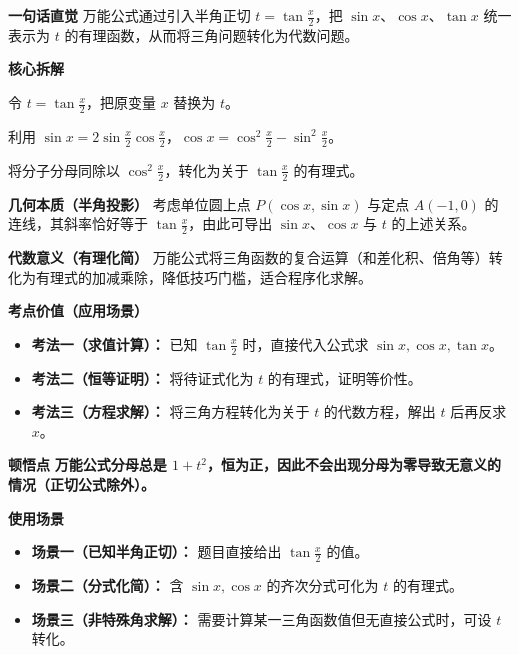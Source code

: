 \begin{explanationbox}
	\textbf{\textcolor{CExplanation}{一句话直觉}}
	万能公式通过引入半角正切 $t = \tan\frac{x}{2}$，把 $\sin x$、$\cos x$、$\tan x$ 统一表示为 $t$ 的有理函数，从而将三角问题转化为代数问题。

	\medskip
	\textbf{\textcolor{CExplanation}{核心拆解}}
	\begin{description}[style=nextline, leftmargin=2.8em, labelsep=0.5em, itemsep=0.45em]
		\item[\textbf{要点一（半角代换）：}]
			令 $t = \tan\frac{x}{2}$，把原变量 $x$ 替换为 $t$。
		\item[\textbf{要点二（二倍角转化）：}]
			利用 $\sin x = 2\sin\frac{x}{2}\cos\frac{x}{2}$，$\cos x = \cos^2\frac{x}{2} - \sin^2\frac{x}{2}$。
		\item[\textbf{要点三（有理化处理）：}]
			将分子分母同除以 $\cos^2\frac{x}{2}$，转化为关于 $\tan\frac{x}{2}$ 的有理式。
	\end{description}

	\medskip
	\textbf{\textcolor{CExplanation}{几何本质（半角投影）}}
	考虑单位圆上点 $P(\cos x, \sin x)$ 与定点 $A(-1,0)$ 的连线，其斜率恰好等于 $\tan\frac{x}{2}$，由此可导出 $\sin x$、$\cos x$ 与 $t$ 的上述关系。

	\medskip
	\textbf{\textcolor{CExplanation}{代数意义（有理化简）}}
	万能公式将三角函数的复合运算（和差化积、倍角等）转化为有理式的加减乘除，降低技巧门槛，适合程序化求解。

	\medskip
	\textbf{\textcolor{CExplanation}{考点价值（应用场景）}}
	\begin{itemize}[leftmargin=*, itemsep=0.5em, topsep=0.4em]
		\item \textbf{考法一（求值计算）：} 已知 $\tan\frac{x}{2}$ 时，直接代入公式求 $\sin x,\cos x,\tan x$。
		\item \textbf{考法二（恒等证明）：} 将待证式化为 $t$ 的有理式，证明等价性。
		\item \textbf{考法三（方程求解）：} 将三角方程转化为关于 $t$ 的代数方程，解出 $t$ 后再反求 $x$。
	\end{itemize}

	\medskip
	\textbf{\textcolor{CExplanation}{顿悟点}}
	\textbf{万能公式分母总是 $1+t^2$，恒为正，因此不会出现分母为零导致无意义的情况（正切公式除外）。}

	\medskip
	\textbf{\textcolor{CExplanation}{使用场景}}
	\begin{itemize}[leftmargin=*, itemsep=0.5em, topsep=0.4em]
		\item \textbf{场景一（已知半角正切）：} 题目直接给出 $\tan\frac{x}{2}$ 的值。
		\item \textbf{场景二（分式化简）：} 含 $\sin x,\cos x$ 的齐次分式可化为 $t$ 的有理式。
		\item \textbf{场景三（非特殊角求解）：} 需要计算某一三角函数值但无直接公式时，可设 $t$ 转化。
	\end{itemize}

\end{explanationbox}
